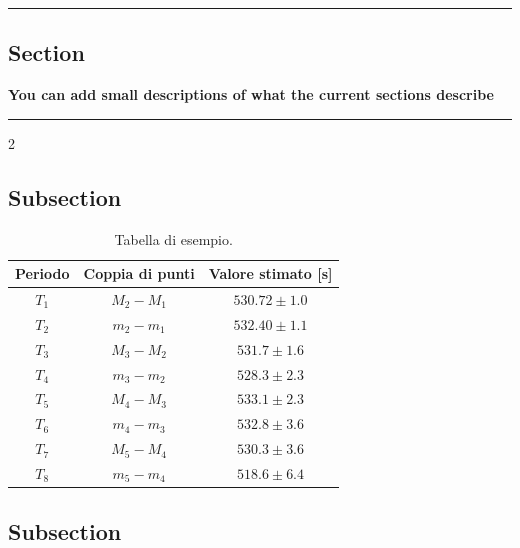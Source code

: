 {\color{gray}\hrule}
\begin{center}
\section{Section}
\textbf{You can add small descriptions of what the current sections describe}
\bigskip
\end{center}
{\color{gray}\hrule}
\begin{multicols}{2}
\subsection{Subsection}
\lipsum[1-3]
\begin{table}[H]
    \centering
    \begin{tabular}{|c|c|c|}
    \hline
       \textbf{Periodo} &\textbf{Coppia di punti} & \textbf{Valore stimato [s]} \\ \hline \hline
        $T_1$ & $M_2- M_1$ & $530.72\pm 1.0$ \\ \hline
        $T_2$ &$ m_2- m_1$ & $532.40\pm 1.1 $\\ \hline
        $T_3$ &$ M_3 -M_2$ & $531.7\pm 1.6 $\\ \hline
        $T_4$ &$ m_3- m_2$ &$ 528.3\pm 2.3$ \\ \hline
        $T_5$ &$ M_4- M_3 $& $533.1\pm 2.3$ \\ \hline
        $T_6$ &$ m_4- m_3$ & $532.8\pm 3.6$ \\ \hline
        $T_7$ & $M_5 - M_4$ & $530.3\pm 3.6$ \\ \hline
        $T_8$ & $m_5- m_4$ & $518.6\pm 6.4 $\\ \hline
    \end{tabular}
    \caption{\small Tabella di esempio.}
    \label{tab:periodi}
\end{table}
\subsection{Subsection}
\lipsum[1-2]
\end{multicols}